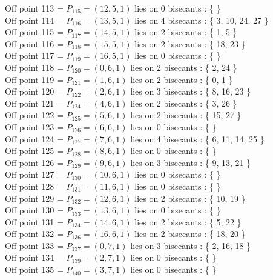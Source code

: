 \documentclass{article}
\begin{document}
{Off point 113 = $P_{115} = ( 12, 5, 1 )$ lies on 0 bisecants : \{  \}\\
Off point 114 = $P_{116} = ( 13, 5, 1 )$ lies on 4 bisecants : \{ 3, 10, 24, 27 \}\\
Off point 115 = $P_{117} = ( 14, 5, 1 )$ lies on 2 bisecants : \{ 1, 5 \}\\
Off point 116 = $P_{118} = ( 15, 5, 1 )$ lies on 2 bisecants : \{ 18, 23 \}\\
Off point 117 = $P_{119} = ( 16, 5, 1 )$ lies on 0 bisecants : \{  \}\\
Off point 118 = $P_{120} = ( 0, 6, 1 )$ lies on 2 bisecants : \{ 2, 24 \}\\
Off point 119 = $P_{121} = ( 1, 6, 1 )$ lies on 2 bisecants : \{ 0, 1 \}\\
Off point 120 = $P_{122} = ( 2, 6, 1 )$ lies on 3 bisecants : \{ 8, 16, 23 \}\\
Off point 121 = $P_{124} = ( 4, 6, 1 )$ lies on 2 bisecants : \{ 3, 26 \}\\
Off point 122 = $P_{125} = ( 5, 6, 1 )$ lies on 2 bisecants : \{ 15, 27 \}\\
Off point 123 = $P_{126} = ( 6, 6, 1 )$ lies on 0 bisecants : \{  \}\\
Off point 124 = $P_{127} = ( 7, 6, 1 )$ lies on 4 bisecants : \{ 6, 11, 14, 25 \}\\
Off point 125 = $P_{128} = ( 8, 6, 1 )$ lies on 0 bisecants : \{  \}\\
Off point 126 = $P_{129} = ( 9, 6, 1 )$ lies on 3 bisecants : \{ 9, 13, 21 \}\\
Off point 127 = $P_{130} = ( 10, 6, 1 )$ lies on 0 bisecants : \{  \}\\
Off point 128 = $P_{131} = ( 11, 6, 1 )$ lies on 0 bisecants : \{  \}\\
Off point 129 = $P_{132} = ( 12, 6, 1 )$ lies on 2 bisecants : \{ 10, 19 \}\\
Off point 130 = $P_{133} = ( 13, 6, 1 )$ lies on 0 bisecants : \{  \}\\
Off point 131 = $P_{134} = ( 14, 6, 1 )$ lies on 2 bisecants : \{ 5, 22 \}\\
Off point 132 = $P_{136} = ( 16, 6, 1 )$ lies on 2 bisecants : \{ 18, 20 \}\\
Off point 133 = $P_{137} = ( 0, 7, 1 )$ lies on 3 bisecants : \{ 2, 16, 18 \}\\
Off point 134 = $P_{139} = ( 2, 7, 1 )$ lies on 0 bisecants : \{  \}\\
Off point 135 = $P_{140} = ( 3, 7, 1 )$ lies on 0 bisecants : \{  \}\\
}
\end{document}
